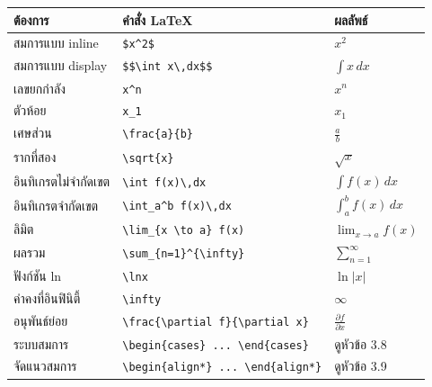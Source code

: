 \documentclass[
  thai,
  12pt,
  letterpaper,
  DIV=11,
  numbers=noendperiod]{scrartcl}
\newcounter{none} %
\begin{document}
{\def\LTcaptype{none} %
\begin{longtable}[]{@{}
  >{\raggedright\arraybackslash}p{}
  >{\raggedright\arraybackslash}p{}
  >{\raggedright\arraybackslash}p{}@{}}
\toprule\noalign{}
\begin{minipage}[b]{\linewidth}\raggedright
ต้องการ
\end{minipage} & \begin{minipage}[b]{\linewidth}\raggedright
คำสั่ง LaTeX
\end{minipage} & \begin{minipage}[b]{\linewidth}\raggedright
ผลลัพธ์
\end{minipage} \\
\midrule\noalign{}
\endhead
\bottomrule\noalign{}
\endlastfoot
สมการแบบ inline & \texttt{\$x\^{}2\$} & \(x^2\) \\
สมการแบบ display &
\texttt{\$\$\textbackslash{}int\ x\textbackslash{},dx\$\$} &
\(\int x\,dx\) \\
เลขยกกำลัง & \texttt{x\^{}n} & \(x^n\) \\
ตัวห้อย & \texttt{x\_1} & \(x_1\) \\
เศษส่วน & \texttt{\textbackslash{}frac\{a\}\{b\}} & \(\frac{a}{b}\) \\
รากที่สอง & \texttt{\textbackslash{}sqrt\{x\}} & \(\sqrt{x}\) \\
อินทิเกรตไม่จำกัดเขต & \texttt{\textbackslash{}int\ f(x)\textbackslash{},dx}
& \(\int f(x)\,dx\) \\
อินทิเกรตจำกัดเขต &
\texttt{\textbackslash{}int\_a\^{}b\ f(x)\textbackslash{},dx} &
\(\int_a^b f(x)\,dx\) \\
ลิมิต & \texttt{\textbackslash{}lim\_\{x\ \textbackslash{}to\ a\}\ f(x)} &
\(\lim_{x \to a} f(x)\) \\
ผลรวม &
\texttt{\textbackslash{}sum\_\{n=1\}\^{}\{\textbackslash{}infty\}} &
\(\sum_{n=1}^{\infty}\) \\
ฟังก์ชัน ln & \texttt{\textbackslash{}ln\textbar{}x\textbar{}} &
\(\ln|x|\) \\
ค่าคงที่อินฟินิตี้ & \texttt{\textbackslash{}infty} & \(\infty\) \\
อนุพันธ์ย่อย &
\texttt{\textbackslash{}frac\{\textbackslash{}partial\ f\}\{\textbackslash{}partial\ x\}}
& \(\frac{\partial f}{\partial x}\) \\
ระบบสมการ &
\texttt{\textbackslash{}begin\{cases\}\ ...\ \textbackslash{}end\{cases\}}
& ดูหัวข้อ 3.8 \\
จัดแนวสมการ &
\texttt{\textbackslash{}begin\{align*\}\ ...\ \textbackslash{}end\{align*\}}
& ดูหัวข้อ 3.9 \\
\end{longtable}
}
\end{document}
